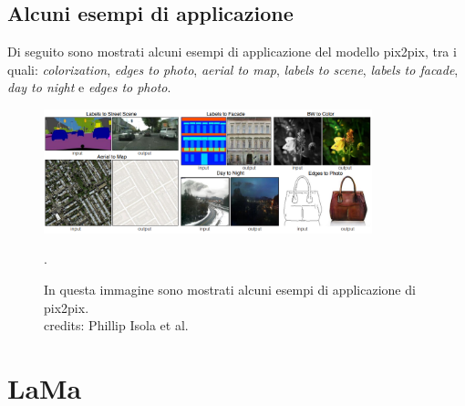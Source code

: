 \subsection{Alcuni esempi di applicazione}
Di seguito sono mostrati alcuni esempi di applicazione del modello pix2pix, tra i quali: \textit{colorization}, \textit{edges to photo}, \textit{aerial to map},
\textit{labels to scene}, \textit{labels to facade}, \textit{day to night} e \textit{edges to photo}.
    \begin{figure}[H]
        \centering
        \includegraphics[width=0.85\textwidth]{imgs/pix2pix_example_tasks.png}
        \caption{In questa immagine sono mostrati alcuni esempi di applicazione di pix2pix.\\
            credits: Phillip Isola et al. \cite{isola2018imagetoimage}}.
        \label{fig:pix2pix_example_tasks}
    \end{figure}


\section{LaMa}
\label{sec:lama}

